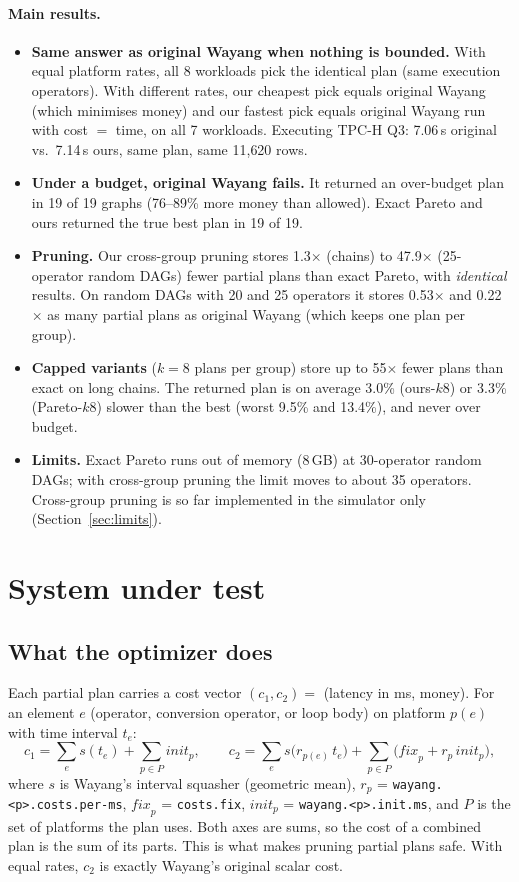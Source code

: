 \documentclass[10pt,a4paper]{article}
\begin{document}
\paragraph{Main results.}
\begin{itemize}
\item \textbf{Same answer as original Wayang when nothing is bounded.} With equal platform rates, all 8 workloads
pick the identical plan (same execution operators). With different rates, our cheapest pick equals original Wayang
(which minimises money) and our fastest pick equals original Wayang run with cost $=$ time, on all 7 workloads.
Executing TPC-H Q3: 7.06\,s original vs.\ 7.14\,s ours, same plan, same 11{,}620 rows.
\item \textbf{Under a budget, original Wayang fails.} It returned an over-budget plan in 19 of 19 graphs (76--89\%
more money than allowed). Exact Pareto and ours returned the true best plan in 19 of 19.
\item \textbf{Pruning.} Our cross-group pruning stores 1.3$\times$ (chains) to 47.9$\times$ (25-operator random DAGs)
fewer partial plans than exact Pareto, with \emph{identical} results. On random DAGs with 20 and 25 operators it stores
0.53$\times$ and 0.22$\times$ as many partial plans as original Wayang (which keeps one plan per group).
\item \textbf{Capped variants} ($k=8$ plans per group) store up to 55$\times$ fewer plans than exact on long chains.
The returned plan is on average 3.0\% (ours-$k8$) or 3.3\% (Pareto-$k8$) slower than the best (worst 9.5\% and
13.4\%), and never over budget.
\item \textbf{Limits.} Exact Pareto runs out of memory (8\,GB) at 30-operator random DAGs; with cross-group pruning
the limit moves to about 35 operators. Cross-group pruning is so far implemented in the simulator only
(Section~\ref{sec:limits}).
\end{itemize}

\section{System under test}

\subsection{What the optimizer does}
Each partial plan carries a cost vector $(c_1, c_2) =$ (latency in ms, money). For an element $e$ (operator,
conversion operator, or loop body) on platform $p(e)$ with time interval $t_e$:
\[
c_1 = \sum_e s(t_e) + \sum_{p\in P}\mathit{init}_p,\qquad
c_2 = \sum_e s\bigl(r_{p(e)}\, t_e\bigr) + \sum_{p\in P}\bigl(\mathit{fix}_p + r_p\,\mathit{init}_p\bigr),
\]
where $s$ is Wayang's interval squasher (geometric mean), $r_p$ = \texttt{wayang.<p>.costs.per-ms},
$\mathit{fix}_p$ = \texttt{costs.fix}, $\mathit{init}_p$ = \texttt{wayang.<p>.init.ms}, and $P$ is the set of
platforms the plan uses. Both axes are sums, so the cost of a combined plan is the sum of its parts. This is what
makes pruning partial plans safe. With equal rates, $c_2$ is exactly Wayang's original scalar cost.
\end{document}
